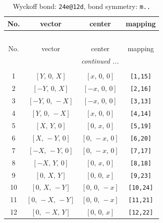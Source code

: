 \documentclass[fleqn,8pt]{jsarticle}
\begin{document}
\begin{longtable}{cccc}
\caption{Wyckoff bond: {\tt 24e@12d}, bond symmetry: {\tt m..}}
 \\
 \hline \hline
No. & vector & center & mapping \\ \hline \endfirsthead

\multicolumn{3}{l}{\tablename\ \thetable{}} \\
 \hline \hline
No. & vector & center & mapping \\ \hline \endhead

 \hline \hline
\multicolumn{3}{r}{\footnotesize\it continued ...} \\ \endfoot

 \hline \hline
\multicolumn{3}{r}{} \\ \endlastfoot

1 & $\left[ Y,\, 0,\, X \right]$ & $\left[ x,\, 0,\, 0 \right]$ & {\tt [1,15]} \\ \hline
2 & $\left[ - Y,\, 0,\, X \right]$ & $\left[ - x,\, 0,\, 0 \right]$ & {\tt [2,16]} \\ \hline
3 & $\left[ - Y,\, 0,\, - X \right]$ & $\left[ - x,\, 0,\, 0 \right]$ & {\tt [3,13]} \\ \hline
4 & $\left[ Y,\, 0,\, - X \right]$ & $\left[ x,\, 0,\, 0 \right]$ & {\tt [4,14]} \\ \hline
5 & $\left[ X,\, Y,\, 0 \right]$ & $\left[ 0,\, x,\, 0 \right]$ & {\tt [5,19]} \\ \hline
6 & $\left[ X,\, - Y,\, 0 \right]$ & $\left[ 0,\, - x,\, 0 \right]$ & {\tt [6,20]} \\ \hline
7 & $\left[ - X,\, - Y,\, 0 \right]$ & $\left[ 0,\, - x,\, 0 \right]$ & {\tt [7,17]} \\ \hline
8 & $\left[ - X,\, Y,\, 0 \right]$ & $\left[ 0,\, x,\, 0 \right]$ & {\tt [8,18]} \\ \hline
9 & $\left[ 0,\, X,\, Y \right]$ & $\left[ 0,\, 0,\, x \right]$ & {\tt [9,23]} \\ \hline
10 & $\left[ 0,\, X,\, - Y \right]$ & $\left[ 0,\, 0,\, - x \right]$ & {\tt [10,24]} \\ \hline
11 & $\left[ 0,\, - X,\, - Y \right]$ & $\left[ 0,\, 0,\, - x \right]$ & {\tt [11,21]} \\ \hline
12 & $\left[ 0,\, - X,\, Y \right]$ & $\left[ 0,\, 0,\, x \right]$ & {\tt [12,22]} \\
\end{longtable}
\renewcommand{\arraystretch}{1.2}
\end{document}
